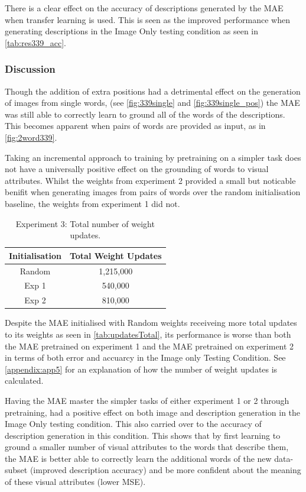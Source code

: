 There is a clear effect on the accuracy of descriptions generated by the \ac{MAE} when transfer learning is used. This is seen as the improved performance when generating descriptions in the Image Only testing condition as seen in \autoref{tab:res339_acc}.


\subsubsection{Discussion}
Though the addition of extra positions had a detrimental effect on the generation of images from single words, (see \autoref{fig:339single} and \autoref{fig:339single_pos}) the \ac{MAE} was still able to correctly learn to ground all of the words of the descriptions. This becomes apparent when pairs of words are provided as input, as in \autoref{fig:2word339}.

Taking an incremental approach to training by pretraining on a simpler task does not have a universally positive effect on the grounding of words to visual attributes. Whilst the weights from experiment 2 provided a small but noticable benifit when generating images from pairs of words over the random initialisation baseline, the weights from experiment 1 did not. 

\begin{table}
\centering
\begin{tabular}{|c|c|}
\hline
\textbf{Initialisation} & \textbf{Total Weight Updates}\\ \hline
Random &  1,215,000\\ \hline
Exp 1 &  540,000\\ \hline
Exp 2 &  810,000\\ \hline

\end{tabular}
\caption{Experiment 3: Total number of weight updates.}
\label{tab:updatesTotal}
\end{table}

Despite the \ac{MAE} initialised with Random weights receiveing more total updates to its weights as seen in \autoref{tab:updatesTotal}, its performance is worse than both the \ac{MAE} pretrained on experiment 1 and the MAE pretrained on experiment 2 in terms of both error and accuarcy in the Image only Testing Condition. See \autoref{appendix:app5} for an explanation of how the number of weight updates is calculated.

Having the \ac{MAE} master the simpler tasks of either experiment 1 or 2 through pretraining, had a positive effect on both image and description generation in the Image Only testing condition. This also carried over to the accuracy of description generation in this condition. This shows that by first learning to ground a smaller number of visual attributes to the words that describe them, the \ac{MAE} is better able to correctly learn the additional words of the new data-subset (improved description accuracy) and be more confident about the meaning of these visual attributes (lower \ac{MSE}).


